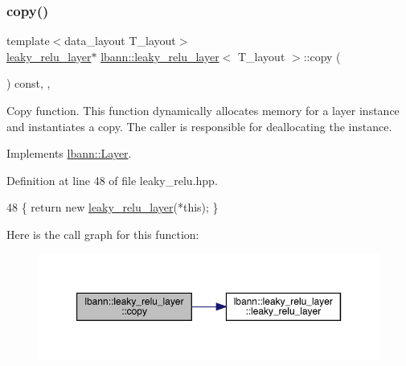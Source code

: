 \subsubsection{\texorpdfstring{copy()}{copy()}}
{\footnotesize\ttfamily template$<$data\+\_\+layout T\+\_\+layout$>$ \\
\hyperlink{classlbann_1_1leaky__relu__layer}{leaky\+\_\+relu\+\_\+layer}$\ast$ \hyperlink{classlbann_1_1leaky__relu__layer}{lbann\+::leaky\+\_\+relu\+\_\+layer}$<$ T\+\_\+layout $>$\+::copy (\begin{DoxyParamCaption}{ }\end{DoxyParamCaption}) const\hspace{0.3cm}{\ttfamily [inline]}, {\ttfamily [override]}, {\ttfamily [virtual]}}

Copy function. This function dynamically allocates memory for a layer instance and instantiates a copy. The caller is responsible for deallocating the instance. 

Implements \hyperlink{classlbann_1_1Layer_af420f22bbac801c85483ade84588a23f}{lbann\+::\+Layer}.



Definition at line 48 of file leaky\+\_\+relu.\+hpp.


\begin{DoxyCode}
48 \{ \textcolor{keywordflow}{return} \textcolor{keyword}{new} \hyperlink{classlbann_1_1leaky__relu__layer_ae401114a3517c40aabde7fbb9d990a1c}{leaky\_relu\_layer}(*\textcolor{keyword}{this}); \}
\end{DoxyCode}
Here is the call graph for this function\+:\nopagebreak
\begin{figure}[H]
\begin{center}
\leavevmode
\includegraphics[width=350pt]{classlbann_1_1leaky__relu__layer_a5567cfef802bfed6be3e092970b88ff9_cgraph}
\end{center}
\end{figure}
\mbox{\label{classlbann_1_1leaky__relu__layer_a9e7ce0b05e8bff42d9176d92c736fbcb}} 
